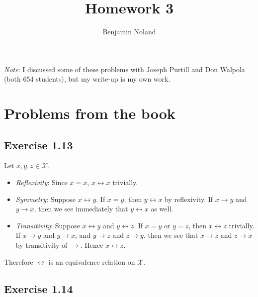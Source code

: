 \documentclass[12pt]{article}
\title{Homework 3}
\author{Benjamin Noland}
\date{}
\begin{document}
\maketitle

\textit{Note}: I discussed some of these problems with Joseph Purtill and Don Walpola (both 654 students), but my write-up is my own work.

\section*{Problems from the book}	

\subsection*{Exercise 1.13}

Let $x, y, z \in \mathcal{X}$.

\begin{itemize}
\item \textit{Reflexivity}: Since $x = x$, $x \leftrightarrow x$ trivially.

\item \textit{Symmetry}: Suppose $x \leftrightarrow y$. If $x = y$, then $y \leftrightarrow x$ by reflexivity. If $x \rightarrow y$ and $y \rightarrow x$, then we see immediately that $y \leftrightarrow x$ as well.

\item \textit{Transitivity}: Suppose $x \leftrightarrow y$ and $y \leftrightarrow z$. If $x = y$ or $y = z$, then $x \leftrightarrow z$ trivially. If $x \rightarrow y$ and $y \rightarrow x$, and $y \rightarrow z$ and $z \rightarrow y$, then we see that $x \rightarrow z$ and $z \rightarrow x$ by transitivity of $\rightarrow$. Hence $x \leftrightarrow z$.
\end{itemize}
Therefore $\leftrightarrow$ is an equivalence relation on $\mathcal{X}$.

\subsection*{Exercise 1.14}
\end{document}
